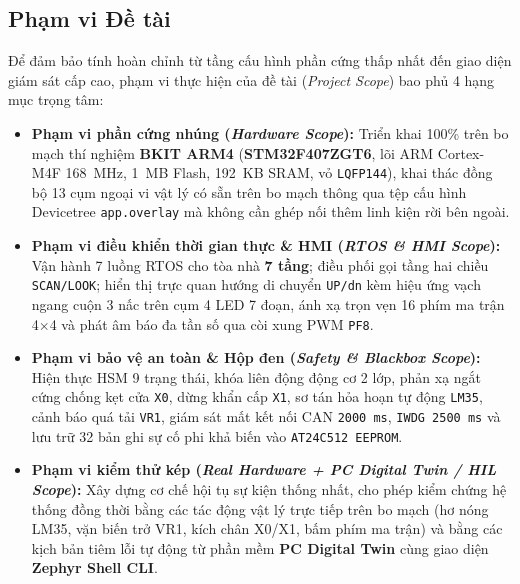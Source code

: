 \subsection{Phạm vi Đề tài}
Để đảm bảo tính hoàn chỉnh từ tầng cấu hình phần cứng thấp nhất đến giao diện giám sát cấp cao, phạm vi thực hiện của đề tài (\textit{Project Scope}) bao phủ 4 hạng mục trọng tâm:
\begin{itemize}[nosep]
    \item \textbf{Phạm vi phần cứng nhúng (\textit{Hardware Scope}):} Triển khai 100\% trên bo mạch thí nghiệm \textbf{BKIT ARM4} (\textbf{STM32F407ZGT6}, lõi ARM Cortex-M4F 168~MHz, 1~MB Flash, 192~KB SRAM, vỏ \texttt{LQFP144}), khai thác đồng bộ 13 cụm ngoại vi vật lý có sẵn trên bo mạch thông qua tệp cấu hình Devicetree \texttt{app.overlay} mà không cần ghép nối thêm linh kiện rời bên ngoài.
    \item \textbf{Phạm vi điều khiển thời gian thực \& HMI (\textit{RTOS \& HMI Scope}):} Vận hành 7 luồng RTOS cho tòa nhà \textbf{7 tầng}; điều phối gọi tầng hai chiều \texttt{SCAN/LOOK}; hiển thị trực quan hướng di chuyển \texttt{UP/dn} kèm hiệu ứng vạch ngang cuộn 3 nấc trên cụm 4 LED 7 đoạn, ánh xạ trọn vẹn 16 phím ma trận 4$\times$4 và phát âm báo đa tần số qua còi xung PWM \texttt{PF8}.
    \item \textbf{Phạm vi bảo vệ an toàn \& Hộp đen (\textit{Safety \& Blackbox Scope}):} Hiện thực HSM 9 trạng thái, khóa liên động động cơ 2 lớp, phản xạ ngắt cứng chống kẹt cửa \texttt{X0}, dừng khẩn cấp \texttt{X1}, sơ tán hỏa hoạn tự động \texttt{LM35}, cảnh báo quá tải \texttt{VR1}, giám sát mất kết nối CAN \texttt{2000~ms}, \texttt{IWDG 2500~ms} và lưu trữ 32 bản ghi sự cố phi khả biến vào \texttt{AT24C512 EEPROM}.
    \item \textbf{Phạm vi kiểm thử kép (\textit{Real Hardware + PC Digital Twin / HIL Scope}):} Xây dựng cơ chế hội tụ sự kiện thống nhất, cho phép kiểm chứng hệ thống đồng thời bằng các tác động vật lý trực tiếp trên bo mạch (hơ nóng LM35, vặn biến trở VR1, kích chân X0/X1, bấm phím ma trận) và bằng các kịch bản tiêm lỗi tự động từ phần mềm \textbf{PC Digital Twin} cùng giao diện \textbf{Zephyr Shell CLI}.
\end{itemize}

